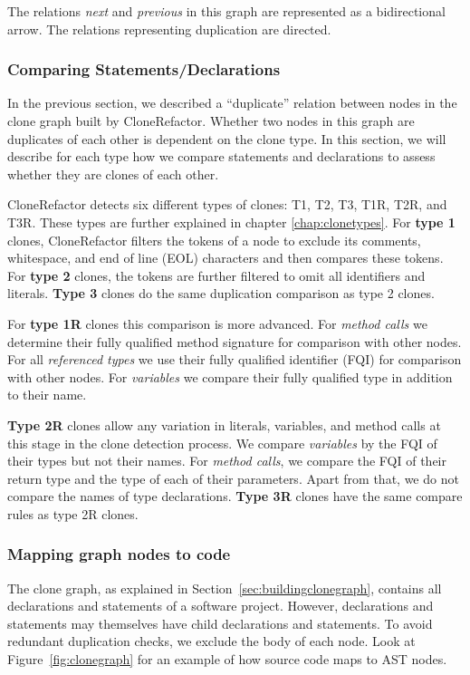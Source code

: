 The relations \textit{next} and \textit{previous} in this graph are represented as a bidirectional arrow. The relations representing duplication are directed. %

\subsubsection{Comparing Statements/Declarations} \label{sec:comparingstuff}
In the previous section, we described a ``duplicate'' relation between nodes in the clone graph built by CloneRefactor. Whether two nodes in this graph are duplicates of each other is dependent on the clone type. In this section, we will describe for each type how we compare statements and declarations to assess whether they are clones of each other.

CloneRefactor detects six different types of clones: T1, T2, T3, T1R, T2R, and T3R. These types are further explained in chapter \ref{chap:clonetypes}. For \textbf{type 1} clones, CloneRefactor filters the tokens of a node to exclude its comments, whitespace, and end of line (EOL) characters and then compares these tokens. For \textbf{type 2} clones, the tokens are further filtered to omit all identifiers and literals. \textbf{Type 3} clones do the same duplication comparison as type 2 clones.

For \textbf{type 1R} clones this comparison is more advanced. For \textit{method calls} we determine their fully qualified method signature for comparison with other nodes. For all \textit{referenced types} we use their fully qualified identifier (FQI) for comparison with other nodes. For \textit{variables} we compare their fully qualified type in addition to their name.

\textbf{Type 2R} clones allow any variation in literals, variables, and method calls at this stage in the clone detection process. We compare \textit{variables} by the FQI of their types but not their names. For \textit{method calls}, we compare the FQI of their return type and the type of each of their parameters. Apart from that, we do not compare the names of type declarations. \textbf{Type 3R} clones have the same compare rules as type 2R clones.

\subsubsection{Mapping graph nodes to code}
The clone graph, as explained in Section~\ref{sec:buildingclonegraph}, contains all declarations and statements of a software project. However, declarations and statements may themselves have child declarations and statements. To avoid redundant duplication checks, we exclude the body of each node. Look at Figure~\ref{fig:clonegraph} for an example of how source code maps to AST nodes.

